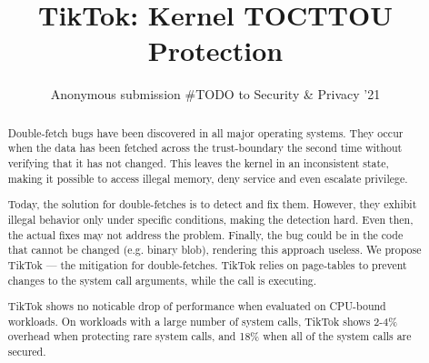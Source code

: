 \documentclass[conference]{IEEEtran}
\newcommand{\sysname}{TikTok}
\newcommand{\roughevaloverheadbad}{18\%}
\newcommand{\roughevaloverheadbetter}{2-4\%}
\begin{document}

\date{}

\title{\Large \bf TikTok: Kernel TOCTTOU Protection}

\author{
Anonymous submission \#TODO to Security & Privacy '21
} %

\maketitle

\begin{abstract}

Double-fetch bugs have been discovered in all major operating systems.
They occur when the data has been fetched across the trust-boundary the second
time without verifying that it has not changed. This leaves the kernel in an
inconsistent state, making it possible to access illegal memory, deny service and
even escalate privilege.

Today, the solution for double-fetches is to detect and fix them. However, they
exhibit illegal behavior only under specific conditions, making the detection
hard. Even then, the actual fixes may not address the problem. Finally, the bug
could be in the code that cannot be changed (e.g. binary blob), rendering this
approach useless. We propose \sysname{} --- the mitigation for double-fetches.
\sysname{} relies on page-tables to prevent changes to the system call arguments,
while the call is executing.

\sysname{} shows no noticable drop of performance when evaluated on CPU-bound
workloads. On workloads with a large number of system calls, \sysname{} shows
\roughevaloverheadbetter{} overhead when protecting rare system calls, and
\roughevaloverheadbad{} when all of the system calls are secured.


\end{abstract}
\end{document}
